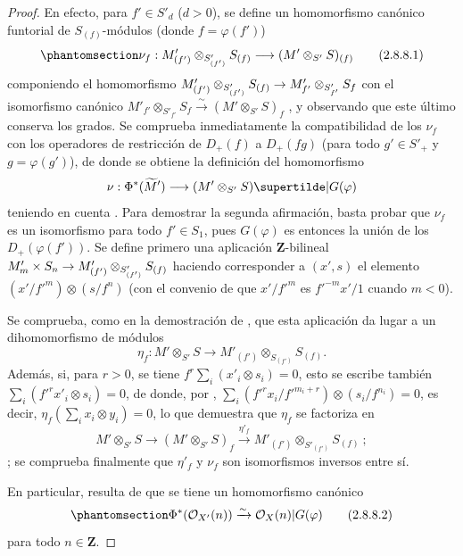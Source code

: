 \documentclass[oneside,10pt]{amsart}
\makeatletter
\newcommand{\ega@arrow}[2]{\mathchoice{#1}{#2}{#2}{#2}}
\renewcommand{\to}{\ega@arrow{\longrightarrow}{\rightarrow}}
\newcommand{\oldpage}[2][]{\marginnote{\normalfont\footnotesize\textbf{#1}~|~#2}\ignorespaces}
\let\EGAOriginalLabel\label
\renewcommand{\label}[1]{\phantomsection\EGAOriginalLabel{#1}}
\makeatother
\begin{document}
\begin{proof}
En efecto, para $f'\in S'_d$ ($d>0$), se define un homomorfismo canónico funtorial de $S_{(f)}$-módulos (donde $f=\varphi(f')$)
\[
\label{II.2.8.8.1-fr}
  \nu_f:M'_{(f')}\otimes_{S'_{(f')}}S_{(f)}
  \longrightarrow(M'\otimes_{S'}S)_{(f)}
\tag{2.8.8.1}
\]
componiendo el homomorfismo $M'_{(f')}\otimes_{S'_{(f')}}S_{(f)}\to
M'_{f'}\otimes_{S'_{f'}}S_f$ con el isomorfismo canónico $M'_{f'}\otimes_{S'_{f'}}S_f\xrightarrow{\sim}(M'\otimes_{S'}S)_f$ , y observando que este último conserva los grados.
Se comprueba inmediatamente la compatibilidad de los $\nu_f$ con los operadores de restricción de $D_+(f)$ a $D_+(fg)$ (para todo $g'\in S'_+$ y $g=\varphi(g')$), de donde se obtiene la definición del homomorfismo
\[
  \nu:\Phi^*(\widetilde{M}')
  \longrightarrow(M'\otimes_{S'}S)\supertilde|G(\varphi)
\]
teniendo en cuenta .
Para demostrar la segunda afirmación, basta probar que $\nu_f$ es un isomorfismo para todo $f'\in S_1$, pues $G(\varphi)$ es entonces la unión de los $D_+(\varphi(f'))$.
Se define primero una aplicación $\mathbf{Z}$-bilineal $M'_m\times S_n\to M'_{(f')}\otimes_{S'_{(f')}}S_{(f)}$ haciendo corresponder a $(x',s)$ el elemento $(x'/{f'}^m)\otimes(s/f^n)$ (con el convenio de que $x'/{f'}^m$ es ${f'}^{-m}x'/1$ 
\oldpage[II]{45}
cuando $m<0$).

Se comprueba, como en la demostración de , que esta aplicación da lugar a un dihomomorfismo de módulos
\[
  \eta_f:M'\otimes_{S'}S
  \longrightarrow M'_{(f')}\otimes_{S_{(f')}}S_{(f)}.
\]
Además, si, para $r>0$, se tiene $f^r\sum_i(x'_i\otimes s_i)=0$, esto se escribe también $\sum_i({f'}^rx'_i\otimes s_i)=0$, de donde, por , $\sum_i({f'}^rx_i/{f'}^{m_i+r})\otimes(s_i/f^{n_i})=0$, es decir, $\eta_f(\sum_i x_i\otimes y_i)=0$, lo que demuestra que $\eta_f$ se factoriza en \[
  M'\otimes_{S'}S\longrightarrow(M'\otimes_{S'}S)_f
  \xrightarrow{\eta'_f}M'_{(f')}\otimes_{S'_{(f')}}S_{(f)}~;
\]; se comprueba finalmente que $\eta'_f$ y $\nu_f$ son isomorfismos inversos entre sí.

En particular, resulta de  que se tiene un homomorfismo canónico
\[
\label{II.2.8.8.2-fr}
  \Phi^*(\mathcal{O}_{X'}(n))\xrightarrow{\sim}
  \mathcal{O}_X(n)|G(\varphi)
\tag{2.8.8.2}
\]
para todo $n\in\mathbf{Z}$.
\end{proof}
\end{document}

